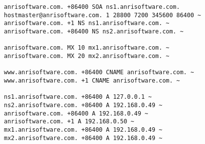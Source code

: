 \begin{lstlisting}[style=rcfile_nonumbers,
label=lst:dns_zone1_example,
title={Example MaraDNS zone configuration file that is created from the 
DNS script. The file is saved as /etc/maradns/db.anrisoftware.com}]
anrisoftware.com. +86400 SOA ns1.anrisoftware.com. hostmaster@anrisoftware.com. 1 28800 7200 345600 86400 ~
anrisoftware.com. +1 NS ns1.anrisoftware.com. ~
anrisoftware.com. +86400 NS ns2.anrisoftware.com. ~

anrisoftware.com. MX 10 mx1.anrisoftware.com. ~
anrisoftware.com. MX 20 mx2.anrisoftware.com. ~

www.anrisoftware.com. +86400 CNAME anrisoftware.com. ~
www.anrisoftware.com. +1 CNAME anrisoftware.com. ~

ns1.anrisoftware.com. +86400 A 127.0.0.1 ~
ns2.anrisoftware.com. +86400 A 192.168.0.49 ~
anrisoftware.com. +86400 A 192.168.0.49 ~
anrisoftware.com. +1 A 192.168.0.50 ~
mx1.anrisoftware.com. +86400 A 192.168.0.49 ~
mx2.anrisoftware.com. +86400 A 192.168.0.49 ~

\end{lstlisting}

